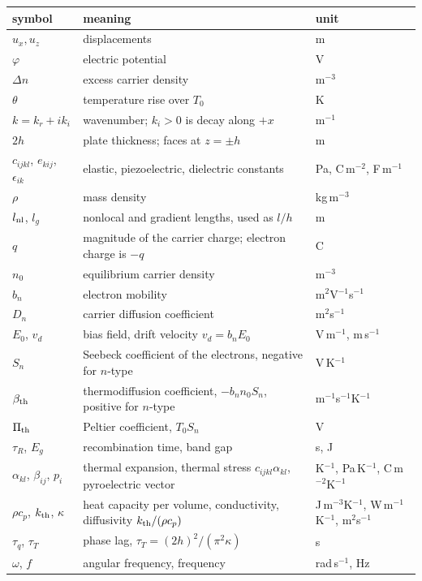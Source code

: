 \documentclass[11pt]{article}
\begin{document}
\begin{center}
\small
\begin{tabular}{p{2.4cm}p{6.7cm}p{3.4cm}}
\toprule
symbol & meaning & unit\\
\midrule
$u_x,u_z$ & displacements & m\\
$\varphi$ & electric potential & V\\
$\Delta n$ & excess carrier density & m$^{-3}$\\
$\theta$ & temperature rise over $T_0$ & K\\
$k=k_r+ik_i$ & wavenumber; $k_i>0$ is decay along $+x$ & m$^{-1}$\\
$2h$ & plate thickness; faces at $z=\pm h$ & m\\
$c_{ijkl}$, $e_{kij}$, $\epsilon_{ik}$ & elastic, piezoelectric, dielectric constants & Pa, C\,m$^{-2}$, F\,m$^{-1}$\\
$\rho$ & mass density & kg\,m$^{-3}$\\
$l_{\rm nl}$, $l_g$ & nonlocal and gradient lengths, used as $l/h$ & m\\
$q$ & magnitude of the carrier charge; electron charge is $-q$ & C\\
$n_0$ & equilibrium carrier density & m$^{-3}$\\
$b_n$ & electron mobility & m$^2$V$^{-1}$s$^{-1}$\\
$D_n$ & carrier diffusion coefficient & m$^2$s$^{-1}$\\
$E_0$, $v_d$ & bias field, drift velocity $v_d=b_nE_0$ & V\,m$^{-1}$, m\,s$^{-1}$\\
$S_n$ & Seebeck coefficient of the electrons, negative for $n$-type & V\,K$^{-1}$\\
$\beta_{\rm th}$ & thermodiffusion coefficient, $-b_nn_0S_n$, positive for $n$-type & m$^{-1}$s$^{-1}$K$^{-1}$\\
$\Pi_{\rm th}$ & Peltier coefficient, $T_0S_n$ & V\\
$\tau_R$, $E_g$ & recombination time, band gap & s, J\\
$\alpha_{kl}$, $\beta_{ij}$, $p_i$ & thermal expansion, thermal stress $c_{ijkl}\alpha_{kl}$, pyroelectric vector & K$^{-1}$, Pa\,K$^{-1}$, C\,m$^{-2}$K$^{-1}$\\
$\rho c_p$, $k_{\rm th}$, $\kappa$ & heat capacity per volume, conductivity, diffusivity $k_{\rm th}/(\rho c_p)$ & J\,m$^{-3}$K$^{-1}$, W\,m$^{-1}$K$^{-1}$, m$^2$s$^{-1}$\\
$\tau_q$, $\tau_T$ & phase lag, $\tau_T=(2h)^2/(\pi^2\kappa)$ & s\\
$\omega$, $f$ & angular frequency, frequency & rad\,s$^{-1}$, Hz\\
\bottomrule
\end{tabular}
\end{center}
\end{document}
